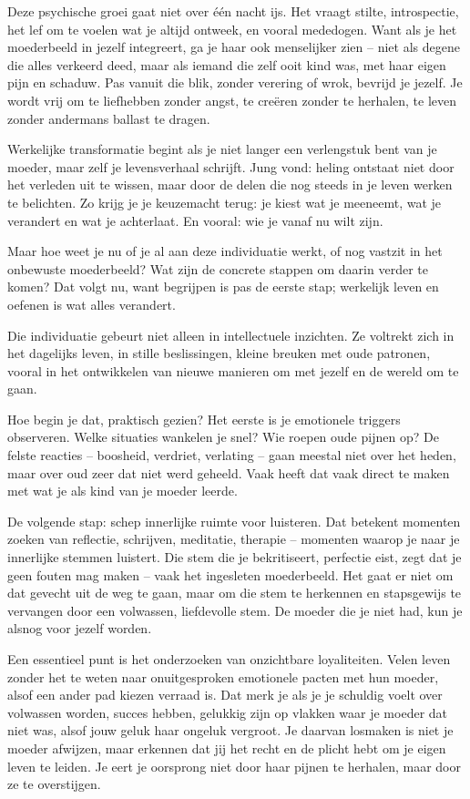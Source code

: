 Deze psychische groei gaat niet over één nacht ijs. Het vraagt stilte, introspectie, het lef om te voelen wat je altijd ontweek, en vooral mededogen. Want als je het moederbeeld in jezelf integreert, ga je haar ook menselijker zien – niet als degene die alles verkeerd deed, maar als iemand die zelf ooit kind was, met haar eigen pijn en schaduw. Pas vanuit die blik, zonder verering of wrok, bevrijd je jezelf. Je wordt vrij om te liefhebben zonder angst, te creëren zonder te herhalen, te leven zonder andermans ballast te dragen.

Werkelijke transformatie begint als je niet langer een verlengstuk bent van je moeder, maar zelf je levensverhaal schrijft. Jung vond: heling ontstaat niet door het verleden uit te wissen, maar door de delen die nog steeds in je leven werken te belichten. Zo krijg je je keuzemacht terug: je kiest wat je meeneemt, wat je verandert en wat je achterlaat. En vooral: wie je vanaf nu wilt zijn.

Maar hoe weet je nu of je al aan deze individuatie werkt, of nog vastzit in het onbewuste moederbeeld? Wat zijn de concrete stappen om daarin verder te komen? Dat volgt nu, want begrijpen is pas de eerste stap; werkelijk leven en oefenen is wat alles verandert.

Die individuatie gebeurt niet alleen in intellectuele inzichten. Ze voltrekt zich in het dagelijks leven, in stille beslissingen, kleine breuken met oude patronen, vooral in het ontwikkelen van nieuwe manieren om met jezelf en de wereld om te gaan.

Hoe begin je dat, praktisch gezien? Het eerste is je emotionele triggers observeren. Welke situaties wankelen je snel? Wie roepen oude pijnen op? De felste reacties – boosheid, verdriet, verlating – gaan meestal niet over het heden, maar over oud zeer dat niet werd geheeld. Vaak heeft dat vaak direct te maken met wat je als kind van je moeder leerde.

De volgende stap: schep innerlijke ruimte voor luisteren. Dat betekent momenten zoeken van reflectie, schrijven, meditatie, therapie – momenten waarop je naar je innerlijke stemmen luistert. Die stem die je bekritiseert, perfectie eist, zegt dat je geen fouten mag maken – vaak het ingesleten moederbeeld. Het gaat er niet om dat gevecht uit de weg te gaan, maar om die stem te herkennen en stapsgewijs te vervangen door een volwassen, liefdevolle stem. De moeder die je niet had, kun je alsnog voor jezelf worden.

Een essentieel punt is het onderzoeken van onzichtbare loyaliteiten. Velen leven zonder het te weten naar onuitgesproken emotionele pacten met hun moeder, alsof een ander pad kiezen verraad is. Dat merk je als je je schuldig voelt over volwassen worden, succes hebben, gelukkig zijn op vlakken waar je moeder dat niet was, alsof jouw geluk haar ongeluk vergroot. Je daarvan losmaken is niet je moeder afwijzen, maar erkennen dat jij het recht en de plicht hebt om je eigen leven te leiden. Je eert je oorsprong niet door haar pijnen te herhalen, maar door ze te overstijgen.

